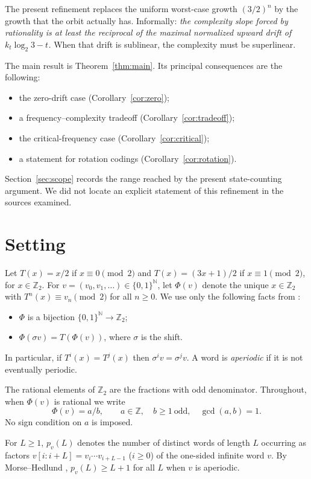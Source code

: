 \documentclass[11pt]{amsart}
\theoremstyle{definition}
\theoremstyle{remark}
\newcommand{\Z}{\mathbb{Z}}
\newcommand{\N}{\mathbb{N}}
\begin{document}
The present refinement replaces the uniform worst-case growth $(3/2)^n$ by the growth that the orbit actually has. Informally: \emph{the complexity slope forced by rationality is at least the reciprocal of the maximal normalized upward drift of $k_t\log_2 3-t$.} When that drift is sublinear, the complexity must be superlinear.

The main result is Theorem~\ref{thm:main}. Its principal consequences are the following:
\begin{itemize}[leftmargin=2em]
\item the zero-drift case (Corollary~\ref{cor:zero});
\item a frequency--complexity tradeoff (Corollary~\ref{cor:tradeoff});
\item the critical-frequency case (Corollary~\ref{cor:critical});
\item a statement for rotation codings (Corollary~\ref{cor:rotation}).
\end{itemize}
Section~\ref{sec:scope} records the range reached by the present state-counting argument. We did not locate an explicit statement of this refinement in the sources examined.

\section{Setting}\label{sec:setting}

Let $T(x)=x/2$ if $x\equiv0\pmod 2$ and $T(x)=(3x+1)/2$ if $x\equiv1\pmod 2$, for $x\in\Z_2$. For $v=(v_0,v_1,\dots)\in\{0,1\}^{\N}$, let $\Phi(v)$ denote the unique $x\in\Z_2$ with $T^n(x)\equiv v_n\pmod 2$ for all $n\ge0$. We use only the following facts from \cite{Ber94,BL96}:
\begin{itemize}[leftmargin=2em]
\item $\Phi$ is a bijection $\{0,1\}^{\N}\to\Z_2$;
\item $\Phi(\sigma v)=T(\Phi(v))$, where $\sigma$ is the shift.
\end{itemize}
In particular, if $T^i(x)=T^j(x)$ then $\sigma^i v=\sigma^j v$. A word is \emph{aperiodic} if it is not eventually periodic.

The rational elements of $\Z_2$ are the fractions with odd denominator. Throughout, when $\Phi(v)$ is rational we write
\[
\Phi(v)=a/b,\qquad a\in\Z,\quad b\ge1\ \text{odd},\quad \gcd(a,b)=1 .
\]
No sign condition on $a$ is imposed.

For $L\ge1$, $p_v(L)$ denotes the number of distinct words of length $L$ occurring as factors $v[i:i+L]=v_i\cdots v_{i+L-1}$ ($i\ge0$) of the one-sided infinite word $v$. By Morse--Hedlund \cite{MH38}, $p_v(L)\ge L+1$ for all $L$ when $v$ is aperiodic.
\end{document}
